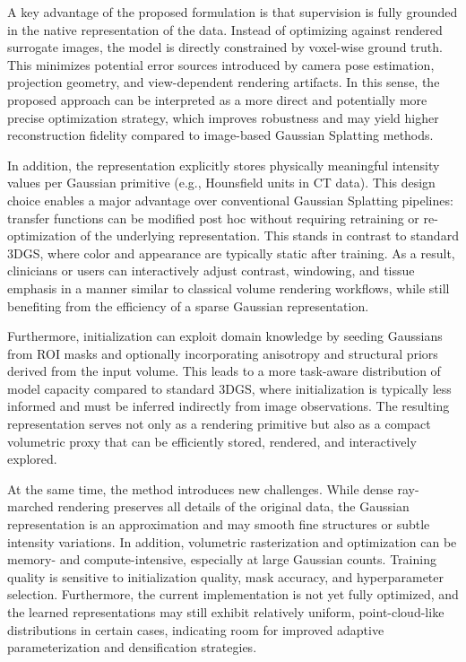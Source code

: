\documentclass[runningheads]{llncs}
\begin{document}
A key advantage of the proposed formulation is that supervision is fully grounded in the native representation of the data. Instead of optimizing against rendered surrogate images, the model is directly constrained by voxel-wise ground truth. This minimizes potential error sources introduced by camera pose estimation, projection geometry, and view-dependent rendering artifacts. In this sense, the proposed approach can be interpreted as a more direct and potentially more precise optimization strategy, which improves robustness and may yield higher reconstruction fidelity compared to image-based Gaussian Splatting methods.

In addition, the representation explicitly stores physically meaningful intensity values per Gaussian primitive (e.g., Hounsfield units in CT data). This design choice enables a major advantage over conventional Gaussian Splatting pipelines: transfer functions can be modified post hoc without requiring retraining or re-optimization of the underlying representation. This stands in contrast to standard 3DGS, where color and appearance are typically static after training. As a result, clinicians or users can interactively adjust contrast, windowing, and tissue emphasis in a manner similar to classical volume rendering workflows, while still benefiting from the efficiency of a sparse Gaussian representation.

Furthermore, initialization can exploit domain knowledge by seeding Gaussians from ROI masks and optionally incorporating anisotropy and structural priors derived from the input volume. This leads to a more task-aware distribution of model capacity compared to standard 3DGS, where initialization is typically less informed and must be inferred indirectly from image observations. The resulting representation serves not only as a rendering primitive but also as a compact volumetric proxy that can be efficiently stored, rendered, and interactively explored.

At the same time, the method introduces new challenges. While dense ray-marched rendering preserves all details of the original data, the Gaussian representation is an approximation and may smooth fine structures or subtle intensity variations. In addition, volumetric rasterization and optimization can be memory- and compute-intensive, especially at large Gaussian counts. Training quality is sensitive to initialization quality, mask accuracy, and hyperparameter selection. Furthermore, the current implementation is not yet fully optimized, and the learned representations may still exhibit relatively uniform, point-cloud-like distributions in certain cases, indicating room for improved adaptive parameterization and densification strategies.
\end{document}
